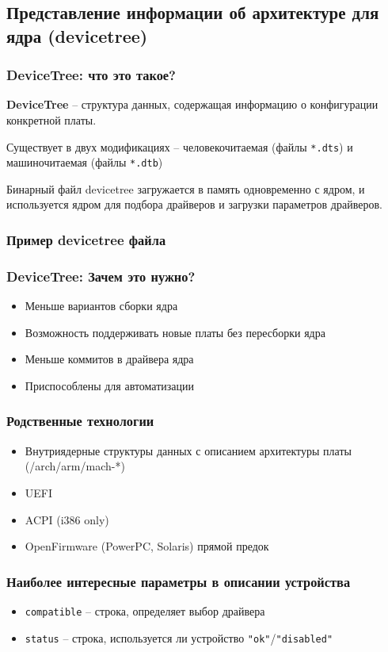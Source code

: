 \subsection{Представление информации об архитектуре для ядра (devicetree)}
\begin{frame}
  \frametitle{DeviceTree: что это такое?}
\textbf{DeviceTree} -- структура данных, содержащая информацию о конфигурации конкретной платы. 

\vspace{1cm}

Существует в двух модификациях -- человекочитаемая (файлы \texttt{*.dts}) и машиночитаемая (файлы \texttt{*.dtb})

\vspace{1cm}

Бинарный файл devicetree загружается в память одновременно с ядром, и используется ядром для подбора драйверов и загрузки параметров драйверов.
\end{frame}

\begin{frame}
  \frametitle{Пример devicetree файла}
\end{frame}

\begin{frame}
  \frametitle{DeviceTree: Зачем это нужно?}
  \begin{itemize}
     \item Меньше вариантов сборки ядра
     \item Возможность поддерживать новые платы без пересборки ядра
     \item Меньше коммитов в драйвера ядра 
     \item Приспособлены для автоматизации
  \end{itemize}
\end{frame}
\begin{frame}
  \frametitle{Родственные технологии}
  \begin{itemize}
      \item Внутриядерные структуры данных с описанием архитектуры платы (/arch/arm/mach-*) 
      \item UEFI
      \item ACPI (i386 only)
      \item OpenFirmware (PowerPC, Solaris) прямой предок
  \end{itemize}
\end{frame}

\begin{frame}
  \frametitle{Наиболее интересные параметры в описании устройства}
  \begin{itemize}
    \item \texttt{compatible} -- строка, определяет выбор драйвера
    \item \texttt{status} -- строка, используется ли устройство \texttt{"ok"}/\texttt{"disabled"}
  \end{itemize}
\end{frame}

